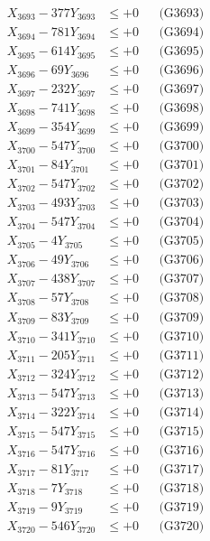 \documentclass[a4paper,10pt]{article}
\begin{document}
{\begin{align}
X_{3693} - 377Y_{3693} &\leq +0 && \text{(G3693)} \\
X_{3694} - 781Y_{3694} &\leq +0 && \text{(G3694)} \\
X_{3695} - 614Y_{3695} &\leq +0 && \text{(G3695)} \\
X_{3696} - 69Y_{3696} &\leq +0 && \text{(G3696)} \\
X_{3697} - 232Y_{3697} &\leq +0 && \text{(G3697)} \\
X_{3698} - 741Y_{3698} &\leq +0 && \text{(G3698)} \\
X_{3699} - 354Y_{3699} &\leq +0 && \text{(G3699)} \\
X_{3700} - 547Y_{3700} &\leq +0 && \text{(G3700)} \\
\allowbreak
X_{3701} - 84Y_{3701} &\leq +0 && \text{(G3701)} \\
X_{3702} - 547Y_{3702} &\leq +0 && \text{(G3702)} \\
X_{3703} - 493Y_{3703} &\leq +0 && \text{(G3703)} \\
X_{3704} - 547Y_{3704} &\leq +0 && \text{(G3704)} \\
X_{3705} - 4Y_{3705} &\leq +0 && \text{(G3705)} \\
X_{3706} - 49Y_{3706} &\leq +0 && \text{(G3706)} \\
X_{3707} - 438Y_{3707} &\leq +0 && \text{(G3707)} \\
X_{3708} - 57Y_{3708} &\leq +0 && \text{(G3708)} \\
X_{3709} - 83Y_{3709} &\leq +0 && \text{(G3709)} \\
X_{3710} - 341Y_{3710} &\leq +0 && \text{(G3710)} \\
\allowbreak
X_{3711} - 205Y_{3711} &\leq +0 && \text{(G3711)} \\
X_{3712} - 324Y_{3712} &\leq +0 && \text{(G3712)} \\
X_{3713} - 547Y_{3713} &\leq +0 && \text{(G3713)} \\
X_{3714} - 322Y_{3714} &\leq +0 && \text{(G3714)} \\
X_{3715} - 547Y_{3715} &\leq +0 && \text{(G3715)} \\
X_{3716} - 547Y_{3716} &\leq +0 && \text{(G3716)} \\
X_{3717} - 81Y_{3717} &\leq +0 && \text{(G3717)} \\
X_{3718} - 7Y_{3718} &\leq +0 && \text{(G3718)} \\
X_{3719} - 9Y_{3719} &\leq +0 && \text{(G3719)} \\
X_{3720} - 546Y_{3720} &\leq +0 && \text{(G3720)} \\

\end{align}}
\end{document}
